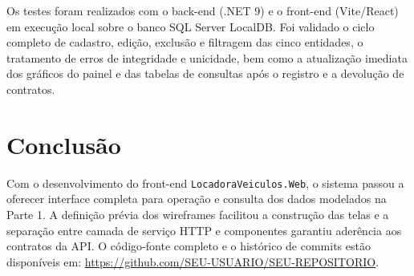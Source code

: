 \documentclass[12pt]{article}
\begin{document}
Os testes foram realizados com o back-end (.NET 9) e o front-end (Vite/React) em execução local sobre o banco SQL Server LocalDB. Foi validado o ciclo completo de cadastro, edição, exclusão e filtragem das cinco entidades, o tratamento de erros de integridade e unicidade, bem como a atualização imediata dos gráficos do painel e das tabelas de consultas após o registro e a devolução de contratos.

\section{Conclusão}

Com o desenvolvimento do front-end \texttt{LocadoraVeiculos.Web}, o sistema passou a oferecer interface completa para operação e consulta dos dados modelados na Parte 1. A definição prévia dos wireframes facilitou a construção das telas e a separação entre camada de serviço HTTP e componentes garantiu aderência aos contratos da API. O código-fonte completo e o histórico de commits estão disponíveis em: \url{https://github.com/SEU-USUARIO/SEU-REPOSITORIO}.


\end{document}
